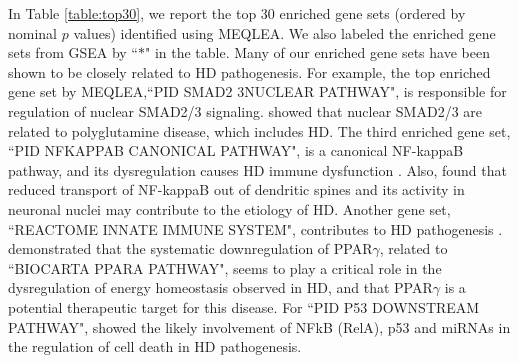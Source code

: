 \documentclass[a4,center,fleqn]{NAR}
\newcommand{\OurMethod}{MEQLEA}
\begin{document}
	In Table \ref{table:top30}, we report the top 30 enriched gene sets (ordered by nominal $p$ values)
	identified using \OurMethod. We also labeled the enriched gene sets from GSEA by ``$\ast$" in the
	table. Many of our enriched gene sets have been shown to be closely related to HD pathogenesis. For
	example, the top enriched gene set by \OurMethod,``PID SMAD2 3NUCLEAR PATHWAY", is responsible for
	regulation of nuclear SMAD2/3 signaling. \cite{katsuno2010disrupted} showed that nuclear SMAD2/3 are
	related to polyglutamine disease, which includes HD. The third enriched gene set, ``PID NFKAPPAB
	CANONICAL PATHWAY", is a canonical NF-kappaB pathway, and its dysregulation causes HD immune
	dysfunction \citep{trager2014htt}. Also, \cite{marcora2010huntington} found that reduced transport
	of NF-kappaB out of dendritic spines and its activity in neuronal nuclei may contribute to the
	etiology of HD. 
	Another gene set, ``REACTOME INNATE IMMUNE SYSTEM", contributes to HD pathogenesis
	\citep{trager2014htt, labadorf2015rna}. %
	\cite{chiang2010modulation} demonstrated that the systematic downregulation of PPAR$\gamma$,
	related to ``BIOCARTA PPARA PATHWAY", seems to play a critical role in the dysregulation of energy
	homeostasis observed in HD, and that PPAR$\gamma$ is a potential therapeutic target for this
	disease. %
	For ``PID P53 DOWNSTREAM PATHWAY", \cite{ghose2011regulation} showed the likely involvement of NFkB
	(RelA), p53 and miRNAs in the regulation of cell death in HD pathogenesis. 
	
\end{document}
